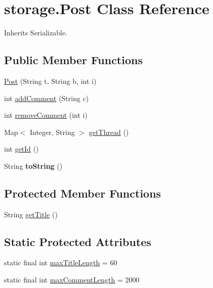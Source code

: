 \hypertarget{classstorage_1_1_post}{
\section{storage.\-Post \-Class \-Reference}
\label{classstorage_1_1_post}
}


\-Inherits \-Serializable.

\subsection*{\-Public \-Member \-Functions}
\begin{DoxyCompactItemize}
\item 
\hyperlink{classstorage_1_1_post_a7cacb0c4ad2421ddccbcc59793fea0d9}{\-Post} (\-String t, \-String b, int i)
\item 
int \hyperlink{classstorage_1_1_post_ace61808c9f6998448d28991a482aea61}{add\-Comment} (\-String c)
\item 
int \hyperlink{classstorage_1_1_post_ad6dcf2b63858bb3af32c0c1b1e3e8481}{remove\-Comment} (int i)
\item 
\-Map$<$ \-Integer, \-String $>$ \hyperlink{classstorage_1_1_post_a01fb48cbf13e05284e0d4565dc7f5b54}{get\-Thread} ()
\item 
int \hyperlink{classstorage_1_1_post_a5ea10a40d723299e944222c5d7f001a8}{get\-Id} ()
\item 
\hypertarget{classstorage_1_1_post_a0fc0eb441352e185ab77e9ed02ecece4}{
\-String {\bfseries to\-String} ()}
\label{classstorage_1_1_post_a0fc0eb441352e185ab77e9ed02ecece4}

\end{DoxyCompactItemize}
\subsection*{\-Protected \-Member \-Functions}
\begin{DoxyCompactItemize}
\item 
\-String \hyperlink{classstorage_1_1_post_a4d5aa6367e3ee812dba819591e9374d2}{get\-Title} ()
\end{DoxyCompactItemize}
\subsection*{\-Static \-Protected \-Attributes}
\begin{DoxyCompactItemize}
\item 
static final int \hyperlink{classstorage_1_1_post_aca0ef12aa167eb825a44deac4601aeac}{max\-Title\-Length} = 60
\item 
static final int \hyperlink{classstorage_1_1_post_ae1acd6948113e41abaac3746752316cd}{max\-Comment\-Length} = 2000
\end{DoxyCompactItemize}



